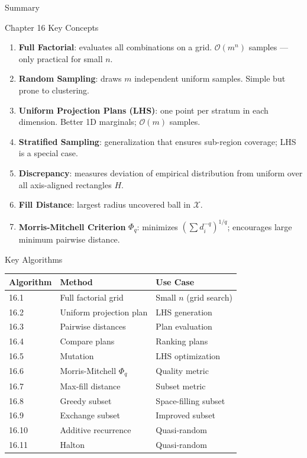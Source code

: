 \documentclass[aspectratio=169,10pt]{beamer}
\begin{document}
\begin{frame}[allowframebreaks]{Summary}
  \begin{block}{Chapter 16 Key Concepts}
    \begin{enumerate}
      \item \textbf{Full Factorial}: evaluates all combinations on a grid.
            $\mathcal{O}(m^n)$ samples --- only practical for small $n$.
      \item \textbf{Random Sampling}: draws $m$ independent uniform samples.
            Simple but prone to clustering.
      \item \textbf{Uniform Projection Plans (LHS)}: one point per stratum in
            each dimension. Better 1D marginals; $\mathcal{O}(m)$ samples.
      \item \textbf{Stratified Sampling}: generalization that ensures
            sub-region coverage; LHS is a special case.
      \item \textbf{Discrepancy}: measures deviation of empirical distribution
            from uniform over all axis-aligned rectangles $H$.
      \item \textbf{Fill Distance}: largest radius uncovered ball in $\mathcal{X}$.
      \item \textbf{Morris-Mitchell Criterion} $\Phi_q$: minimizes
            $(\sum d_i^{-q})^{1/q}$; encourages large minimum pairwise distance.
    \end{enumerate}
  \end{block}

  \framebreak

  \begin{block}{Key Algorithms}
    \begin{tabular}{lll}
      \toprule
      Algorithm & Method & Use Case \\
      \midrule
      16.1 & Full factorial grid & Small $n$ (grid search) \\
      16.2 & Uniform projection plan & LHS generation \\
      16.3 & Pairwise distances & Plan evaluation \\
      16.4 & Compare plans & Ranking plans \\
      16.5 & Mutation & LHS optimization \\
      16.6 & Morris-Mitchell $\Phi_q$ & Quality metric \\
      16.7 & Max-fill distance & Subset metric \\
      16.8 & Greedy subset & Space-filling subset \\
      16.9 & Exchange subset & Improved subset \\
      16.10 & Additive recurrence & Quasi-random \\
      16.11 & Halton & Quasi-random \\
      \bottomrule
    \end{tabular}
  \end{block}


\end{frame}
\end{document}
